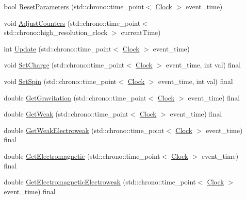 \begin{DoxyCompactItemize}
\item 
bool \hyperlink{class_dimension_af83732dba929ae01aca457e7d6121374}{Reset\+Parameters} (std\+::chrono\+::time\+\_\+point$<$ \hyperlink{universe_8h_a0ef8d951d1ca5ab3cfaf7ab4c7a6fd80}{Clock} $>$ event\+\_\+time)
\item 
void \hyperlink{class_dimension_a31e28c2777888449fad32843f6dd15ed}{Adjust\+Counters} (std\+::chrono\+::time\+\_\+point$<$ std\+::chrono\+::high\+\_\+resolution\+\_\+clock $>$ current\+Time)
\item 
int \hyperlink{class_dimension_a663916c2573b6df4db02ccee5678a75d}{Update} (std\+::chrono\+::time\+\_\+point$<$ \hyperlink{universe_8h_a0ef8d951d1ca5ab3cfaf7ab4c7a6fd80}{Clock} $>$ event\+\_\+time)
\item 
void \hyperlink{class_dimension_a6d3f7fa4a26b92d8ae6161a1b8bb8220}{Set\+Charge} (std\+::chrono\+::time\+\_\+point$<$ \hyperlink{universe_8h_a0ef8d951d1ca5ab3cfaf7ab4c7a6fd80}{Clock} $>$ event\+\_\+time, int val) final
\item 
void \hyperlink{class_dimension_a8d73c050c67b0226572b4a1b08ae6594}{Set\+Spin} (std\+::chrono\+::time\+\_\+point$<$ \hyperlink{universe_8h_a0ef8d951d1ca5ab3cfaf7ab4c7a6fd80}{Clock} $>$ event\+\_\+time, int val) final
\item 
double \hyperlink{class_dimension_a652220a2eb1b26c749ad032865d81788}{Get\+Gravitation} (std\+::chrono\+::time\+\_\+point$<$ \hyperlink{universe_8h_a0ef8d951d1ca5ab3cfaf7ab4c7a6fd80}{Clock} $>$ event\+\_\+time) final
\item 
double \hyperlink{class_dimension_a656ce92d07ea600cc0ec53865ad515e2}{Get\+Weak} (std\+::chrono\+::time\+\_\+point$<$ \hyperlink{universe_8h_a0ef8d951d1ca5ab3cfaf7ab4c7a6fd80}{Clock} $>$ event\+\_\+time) final
\item 
double \hyperlink{class_dimension_a5bb5a164564013a60728854cc2e5ddb3}{Get\+Weak\+Electroweak} (std\+::chrono\+::time\+\_\+point$<$ \hyperlink{universe_8h_a0ef8d951d1ca5ab3cfaf7ab4c7a6fd80}{Clock} $>$ event\+\_\+time) final
\item 
double \hyperlink{class_dimension_a21783c29a576518b722512f1245fa598}{Get\+Electromagnetic} (std\+::chrono\+::time\+\_\+point$<$ \hyperlink{universe_8h_a0ef8d951d1ca5ab3cfaf7ab4c7a6fd80}{Clock} $>$ event\+\_\+time) final
\item 
double \hyperlink{class_dimension_ae1babb1fa280c35966d7ee3de6655e4d}{Get\+Electromagnetic\+Electroweak} (std\+::chrono\+::time\+\_\+point$<$ \hyperlink{universe_8h_a0ef8d951d1ca5ab3cfaf7ab4c7a6fd80}{Clock} $>$ event\+\_\+time) final

\end{DoxyCompactItemize}
